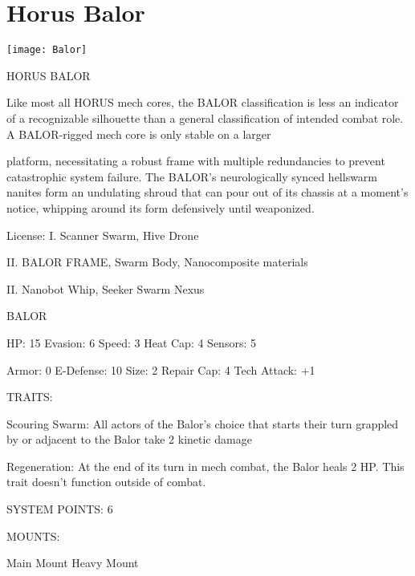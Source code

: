 \section{Horus Balor}

\begin{center}
    \texttt{[image: Balor]}
\end{center}

                                           HORUS BALOR

Like most all HORUS mech cores, the BALOR classification is less an indicator of a recognizable silhouette
than a general classification of intended combat role. A BALOR-rigged mech core is only stable on a larger

platform, necessitating a robust frame with multiple redundancies to prevent catastrophic system failure.
The BALOR’s neurologically synced hellswarm nanites form an undulating shroud that can pour out of its
chassis at a moment’s notice, whipping around its form defensively until weaponized.

                                                  License:
I. Scanner Swarm, Hive Drone

II. BALOR FRAME, Swarm Body, Nanocomposite materials

II. Nanobot Whip, Seeker Swarm Nexus


                                                 BALOR

 HP: 15         Evasion: 6                           Speed: 3           Heat Cap: 4       Sensors: 5

 Armor: 0       E-Defense: 10                        Size: 2            Repair Cap: 4     Tech Attack:
                                                                                          +1

                                                  TRAITS:

 Scouring Swarm: All actors of the Balor’s choice that starts their turn grappled by or adjacent to the
 Balor take 2 kinetic damage

 Regeneration: At the end of its turn in mech combat, the Balor heals 2 HP. This trait doesn’t function
 outside of combat.

                                            SYSTEM POINTS: 6

                                                 MOUNTS:

 Main Mount                                          Heavy Mount

